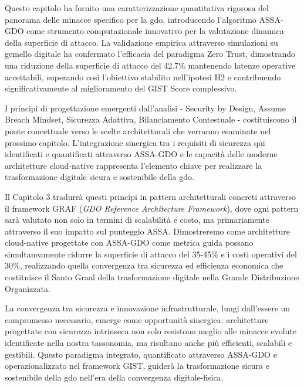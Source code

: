 Questo capitolo ha fornito una caratterizzazione quantitativa rigorosa del panorama delle minacce specifico per la \gls{gdo}, introducendo l'algoritmo ASSA-GDO come strumento computazionale innovativo per la valutazione dinamica della superficie di attacco. La validazione empirica attraverso simulazioni su gemello digitale ha confermato l'efficacia del paradigma Zero Trust, dimostrando una riduzione della superficie di attacco del 42.7\% mantenendo latenze operative accettabili, superando così l'obiettivo stabilito nell'ipotesi H2 e contribuendo significativamente al miglioramento del GIST Score complessivo.

I principi di progettazione emergenti dall'analisi - Security by Design, Assume Breach Mindset, Sicurezza Adattiva, Bilanciamento Contestuale - costituiscono il ponte concettuale verso le scelte architetturali che verranno esaminate nel prossimo capitolo. L'integrazione sinergica tra i requisiti di sicurezza qui identificati e quantificati attraverso ASSA-GDO e le capacità delle moderne architetture cloud-native rappresenta l'elemento chiave per realizzare la trasformazione digitale sicura e sostenibile della \gls{gdo}.

Il Capitolo 3 tradurrà questi principi in pattern architetturali concreti attraverso il framework GRAF (\textit{GDO Reference Architecture Framework}), dove ogni pattern sarà valutato non solo in termini di scalabilità e costo, ma primariamente attraverso il suo impatto sul punteggio ASSA. Dimostreremo come architetture cloud-native progettate con ASSA-GDO come metrica guida possano simultaneamente ridurre la superficie di attacco del 35-45\% e i costi operativi del 30\%, realizzando quella convergenza tra sicurezza ed efficienza economica che costituisce il Santo Graal della trasformazione digitale nella Grande Distribuzione Organizzata.

La convergenza tra sicurezza e innovazione infrastrutturale, lungi dall'essere un compromesso necessario, emerge come opportunità sinergica: architetture progettate con sicurezza intrinseca non solo resistono meglio alle minacce evolute identificate nella nostra tassonomia, ma risultano anche più efficienti, scalabili e gestibili. Questo paradigma integrato, quantificato attraverso ASSA-GDO e operazionalizzato nel framework GIST, guiderà la trasformazione sicura e sostenibile della \gls{gdo} nell'era della convergenza digitale-fisica.

\clearpage
\printbibliography[
    heading=subbibliography,
    title={Riferimenti Bibliografici del Capitolo 2},
]

